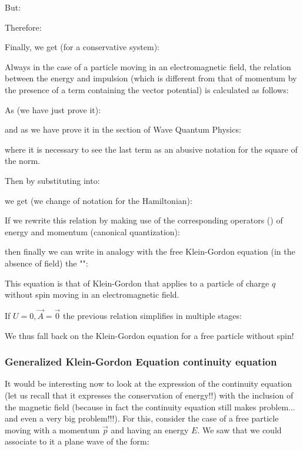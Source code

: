 	But:
	
	Therefore:
	
	Finally, we get (for a conservative system):
	
	Always in the case of a particle moving in an electromagnetic field, the relation between the energy and impulsion (which is different from that of momentum by the presence of a term containing the vector potential) is calculated as follows:

	As (we have just prove it):
	
	and as we have prove it in the section of Wave Quantum Physics:
	
	where it is necessary to see the last term as an abusive notation for the square of the norm.
	
	Then by substituting into:
	
	we get (we change of notation for the Hamiltonian):
	
	If we rewrite this relation by making use of the corresponding operators () of energy and momentum (canonical quantization):
	
	then finally we can write in analogy with the free Klein-Gordon equation (in the absence of field) the "":
	
	This equation is that of Klein-Gordon that applies to a particle of charge $q$ without  spin moving in an electromagnetic field.

	If $U=0,\vec{A}=\vec{0}$ the previous relation simplifies in multiple stages:
	
	We thus fall back on the Klein-Gordon equation for a free particle without spin!
	
	\subsubsection{Generalized Klein-Gordon Equation continuity equation}
	It would be interesting now to look at the expression of the continuity equation (let us recall that it expresses the conservation of energy!!) with the inclusion of the magnetic field (because in fact the continuity equation still makes problem... and even a very big problem!!!). For this, consider the case of a free particle moving with a momentum $\vec{p}$ and having an energy $E$. We saw that we could associate to it a plane wave of the form:
	
